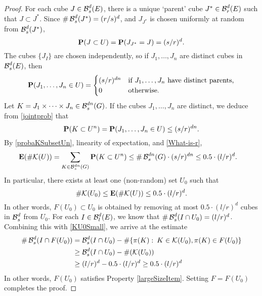 \begin{proof}
	For each cube $J \in \operatorname{\mathcal{B}}_s^d(E)$, there is a unique `parent' cube $J^* \in \operatorname{\mathcal{B}}_r^d(E)$ such that $J \subset J^*$. Since $\# \operatorname{\mathcal{B}}^d_s(J^*) = (r/s)^d$, and $J_{J^*}$ is chosen uniformly at random from $\operatorname{\mathcal{B}}^d_s(J^*)$,
	\[ \operatorname{\operatorname{\mathbf{P}}}(J \subset U) = \operatorname{\operatorname{\mathbf{P}}}(J_{J^*} = J) = (s/r)^d. \]
	The cubes $\{ J_I \}$ are chosen independently, so if $J_1, \dots, J_n$ are distinct cubes in $\operatorname{\mathcal{B}}^d_s(E)$, then 
	\begin{equation}\label{jointprob}
	\operatorname{\operatorname{\mathbf{P}}}(J_1, \dots, J_n \in U) = \begin{cases} (s/r)^{dn} & \text{if $J_1, \dots, J_n$ have distinct parents,} \\ 0 & \text{otherwise}. \end{cases} 
	\end{equation}
	Let $K = J_1 \times \dots \times J_n \in \operatorname{\mathcal{B}}^{dn}_s(G)$. If the cubes $J_1, \dots, J_n$ are distinct, we deduce from \eqref{jointprob} that
	\begin{equation}\label{probaKSubsetUn}
		\operatorname{\operatorname{\mathbf{P}}}(K \subset U^n) = \operatorname{\operatorname{\mathbf{P}}}(J_1, \dots, J_n \in U) \leq (s/r)^{dn}.
	\end{equation}
	By \eqref{probaKSubsetUn}, linearity of expectation, and \eqref{What-is-r},
	\begin{align*}
		\operatorname{\operatorname{\mathbf{E}}}(\# \mathcal{K}(U)) &= \sum_{K \in \operatorname{\mathcal{B}}^{dn}_s(G)} \operatorname{\operatorname{\mathbf{P}}}(K \subset U^n) \leq \# \operatorname{\mathcal{B}}_s^{dn}(G) \cdot (s/r)^{dn}
		\leq 0.5 \cdot (l/r)^d.
	\end{align*}
	In particular, there exists at least one (non-random) set $U_0$ such that
	\begin{equation}\label{KU0Small}
		\# \mathcal{K}(U_0) \leq \operatorname{\operatorname{\mathbf{E}}}(\# \mathcal{K}(U)) \leq 0.5 \cdot (l/r)^d.
	\end{equation}
	 In other words, $F(U_0) \subset U_0$ is obtained by removing at most $0.5 \cdot (l/r)^d$ cubes in $\operatorname{\mathcal{B}}^d_s$ from $U_0$. For each $I \in \operatorname{\mathcal{B}}_l^d(E)$, we know that $\# \operatorname{\mathcal{B}}_{s}^d(I \cap U_0) = (l/r)^d$. Combining this with \eqref{KU0Small}, we arrive at the estimate 
	\begin{align*}
		\# \operatorname{\mathcal{B}}_s^d(I \cap F(U_0)) &= \operatorname{\mathcal{B}}_s^d(I \cap U_0) - \# \{ \pi(K) \operatorname{\colon} K \in \mathcal{K}(U_0), \pi(K) \in F(U_0) \}\\
		&\geq \operatorname{\mathcal{B}}_s^d(I \cap U_0) - \#(\mathcal{K}(U_0))\\
		&\geq (l/r)^d - 0.5 \cdot (l/r)^d \geq 0.5 \cdot (l/r)^d
	\end{align*}  
	In other words, $F(U_0)$ satisfies Property \ref{largeSizeItem}. Setting $F = F(U_0)$ completes the proof.
\end{proof}

